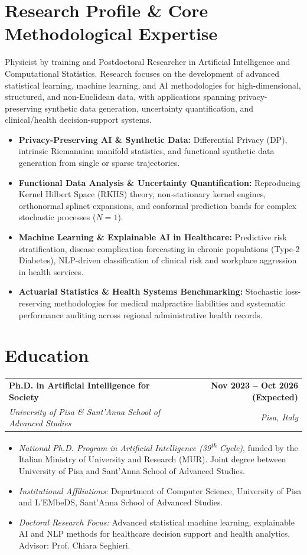 \documentclass[10pt,a4paper]{article}
\makeatletter
\newcommand{\cventry}[5]{
  \vspace{2pt}
  \noindent
  \begin{tabularx}{\textwidth}{@{}X r@{}}
    \textbf{#1} & \textcolor{secondary}{\textbf{#2}} \\
    \textit{#3} & \textit{\textcolor{textdark}{#4}}
  \end{tabularx}
  \vspace{-1pt}
  {\small #5}
  \vspace{2pt}
}
\makeatother
\begin{document}
\section{Research Profile \& Core Methodological Expertise}
Physicist by training and Postdoctoral Researcher in Artificial Intelligence and Computational Statistics. Research focuses on the development of advanced statistical learning, machine learning, and AI methodologies for high-dimensional, structured, and non-Euclidean data, with applications spanning privacy-preserving synthetic data generation, uncertainty quantification, and clinical/health decision-support systems.
\begin{itemize}
    \item \textbf{Privacy-Preserving AI \& Synthetic Data:} Differential Privacy (DP), intrinsic Riemannian manifold statistics, and functional synthetic data generation from single or sparse trajectories.
    \item \textbf{Functional Data Analysis \& Uncertainty Quantification:} Reproducing Kernel Hilbert Space (RKHS) theory, non-stationary kernel engines, orthonormal splinet expansions, and conformal prediction bands for complex stochastic processes ($N = 1$).
    \item \textbf{Machine Learning \& Explainable AI in Healthcare:} Predictive risk stratification, disease complication forecasting in chronic populations (Type-2 Diabetes), NLP-driven classification of clinical risk and workplace aggression in health services.
    \item \textbf{Actuarial Statistics \& Health Systems Benchmarking:} Stochastic loss-reserving methodologies for medical malpractice liabilities and systematic performance auditing across regional administrative health records.
\end{itemize}

\section{Education}

\cventry{Ph.D. in Artificial Intelligence for Society}{Nov 2023 -- Oct 2026 (Expected)}
{University of Pisa \& Sant'Anna School of Advanced Studies}{Pisa, Italy}
{
\begin{itemize}
    \item \textit{National Ph.D. Program in Artificial Intelligence (39\textsuperscript{th} Cycle)}, funded by the Italian Ministry of University and Research (MUR). Joint degree between University of Pisa and Sant'Anna School of Advanced Studies.
    \item \textit{Institutional Affiliations:} Department of Computer Science, University of Pisa and L'EMbeDS, Sant'Anna School of Advanced Studies.
    \item \textit{Doctoral Research Focus:} Advanced statistical machine learning, explainable AI and NLP methods for healthcare decision support and health analytics. Advisor: Prof. Chiara Seghieri.
\end{itemize}
}
\end{document}
